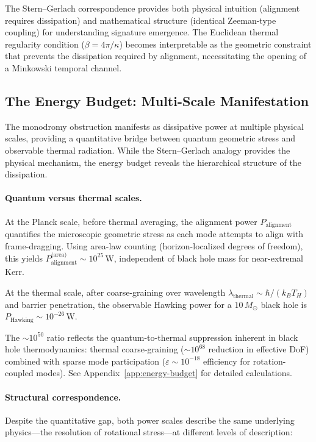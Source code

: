 \documentclass[11pt]{article}
\begin{document}
The Stern--Gerlach correspondence provides both physical intuition (alignment requires 
dissipation) and mathematical structure (identical Zeeman-type coupling) for understanding 
signature emergence. The Euclidean thermal regularity condition ($\beta = 4\pi/\kappa$) 
becomes interpretable as the geometric constraint that prevents the dissipation required 
by alignment, necessitating the opening of a Minkowski temporal channel.

\subsection{The Energy Budget: Multi-Scale Manifestation}
\label{sec:energy-balance}

The monodromy obstruction manifests as dissipative power at multiple physical scales, 
providing a quantitative bridge between quantum geometric stress and observable 
thermal radiation. While the Stern--Gerlach analogy provides the physical mechanism, the energy budget reveals the hierarchical structure 
of the dissipation.

\paragraph{Quantum versus thermal scales.}
At the Planck scale, before thermal averaging, the alignment power $P_{\text{alignment}}$ 
quantifies the microscopic geometric stress as each mode attempts to align with 
frame-dragging. Using area-law counting (horizon-localized degrees of freedom), this 
yields $P_{\text{alignment}}^{\text{(area)}} \sim 10^{25}\,\text{W}$, independent 
of black hole mass for near-extremal Kerr.

At the thermal scale, after coarse-graining over wavelength 
$\lambda_{\text{thermal}} \sim \hbar/(k_B T_H)$ and barrier penetration, the 
observable Hawking power for a $10\,M_\odot$ black hole is 
$P_{\text{Hawking}} \sim 10^{-26}\,\text{W}$.

The $\sim 10^{50}$ ratio reflects the quantum-to-thermal suppression inherent in 
black hole thermodynamics: thermal coarse-graining ($\sim 10^{68}$ reduction in 
effective DoF) combined with sparse mode participation ($\varepsilon \sim 10^{-18}$ 
efficiency for rotation-coupled modes). See Appendix~\ref{app:energy-budget} for 
detailed calculations.

\paragraph{Structural correspondence.}
Despite the quantitative gap, both power scales describe the same underlying physics---the 
resolution of rotational stress---at different levels of description:
\end{document}
